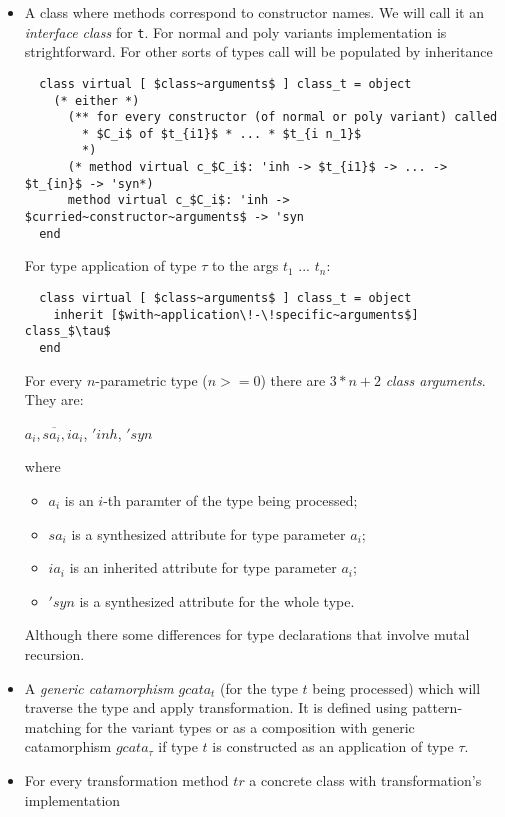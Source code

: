 \documentclass[acmsmall,review,anonymous]{acmart}\settopmatter{printfolios=true,printccs=false,printacmref=false}
\begin{document}
\begin{itemize}
  \item A class where methods correspond to constructor names. We will call it an \textit{interface class} for \lstinline{t}. For normal and poly variants implementation is strightforward. For other sorts of types call will be populated by inheritance
  \begin{lstlisting}
  class virtual [ $class~arguments$ ] class_t = object
    (* either *)
      (** for every constructor (of normal or poly variant) called
        * $C_i$ of $t_{i1}$ * ... * $t_{i n_1}$
        *)
      (* method virtual c_$C_i$: 'inh -> $t_{i1}$ -> ... ->  $t_{in}$ -> 'syn*)
      method virtual c_$C_i$: 'inh -> $curried~constructor~arguments$ -> 'syn
  end
  \end{lstlisting}
  For type application of type $\tau$ to the args $t_1$ ... $t_n$: 
  \begin{lstlisting}
  class virtual [ $class~arguments$ ] class_t = object
    inherit [$with~application\!-\!specific~arguments$] class_$\tau$
  end
  \end{lstlisting}

  For every $n$-parametric type ($n>=0$) there are $3*n+2$ \textit{class arguments}. They are:
    \begin{center}
        $\overline{a_i, sa_i, ia_i}$, $'inh$, $'syn$
    \end{center}
  where \begin{itemize}
          \item $a_i$ is an $i$-th paramter of the type being processed;
          \item $sa_i$ is a synthesized attribute for type parameter $a_i$;
          \item $ia_i$ is an inherited attribute for type parameter $a_i$;
          \item $'syn$ is a synthesized attribute for the whole type.
  \end{itemize}
  
  Although there some differences for type declarations that involve mutal recursion.
  
  \item A \textit{generic catamorphism} $gcata_t$ (for the type $t$ being processed) which will traverse the type and apply transformation. It is defined using pattern-matching for the variant types or as a composition with generic catamorphism $gcata_\tau$ if type $t$ is constructed as an application of type $\tau$.
  \item For every transformation method $tr$ a concrete class with transformation's implementation


\end{itemize}
\end{document}
